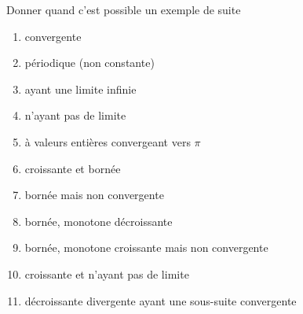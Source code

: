 
\begin{exercice}\label{exo0006}

Donner quand c'est possible un exemple de suite 

\begin{enumerate}
	\item convergente
	\item périodique (non constante)
	\item ayant une limite infinie
	\item n'ayant pas de limite
	\item à valeurs entières convergeant vers $\pi$
	\item croissante et bornée
	\item bornée mais non convergente
	\item bornée, monotone décroissante
	\item bornée, monotone croissante mais non convergente
	\item croissante et n'ayant pas de limite
	\item décroissante divergente ayant une sous-suite convergente
\end{enumerate}


\end{exercice}
